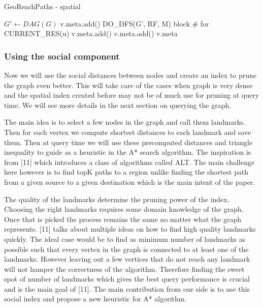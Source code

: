 {\begin{algorithm}[t]
\caption{GeoReachPaths - spatial}
\label{alg1}
\begin{algorithmic}[1]
  \State $G' \gets DAG(G)$
  	 
  	\State v.meta.add()
	\State {}
  \EndFor
  \State DO\_DFS(G', RF, M)  
\EndFunction
{}
	\State \Return block \# for CURRENT\_RES(u)
\EndFunction
{}
		\State {}
	\EndWhile
\EndFunction
{}
		\State v.meta.add()
		\State {}
	\EndFor
\EndFunction
{}
		\State v.meta.add()
	\EndFor
	\State \Return v.meta
\EndFunction
\end{algorithmic}
\end{algorithm}

\subsubsection{Using the social component}
Now we will use the social distances between nodes and create an index to prune the graph even better. This will take care of the cases when graph is very dense and the spatial index created before may not be of much use for pruning at query time. We will see more details in the next section on querying the graph.

The main idea is to select a few nodes in the graph and call them landmarks. Then for each vertex we compute shortest distances to each landmark and save them. Then at query time we will use these precomputed distances and triangle inequality to guide as a heuristic in the A* search algorithm. The inspiration is from [11] which introduces a class of algorithms called ALT. The main challenge here however is to find topK paths to a region unlike finding the shortest path from a given source to a given destination which is the main intent of the paper.

The quality of the landmarks determine the pruning power of the index. Choosing the right landmarks requires some domain knowledge of the graph. Once that is picked the process remains the same no matter what the graph represents. [11] talks about multiple ideas on how to find high quality landmarks quickly. The ideal case would be to find as minimum number of landmarks as possible such that every vertex in the graph is connected to at least one of the landmarks.  However leaving out a few vertices that do not reach any landmark will not hamper the correctness of the algorithm. Therefore finding the sweet spot of number of landmarks which gives the best query performance is crucial and is the main goal of [11]. The main contribution from our side is to use this social index and propose a new heuristic for A* algorithm.

}
